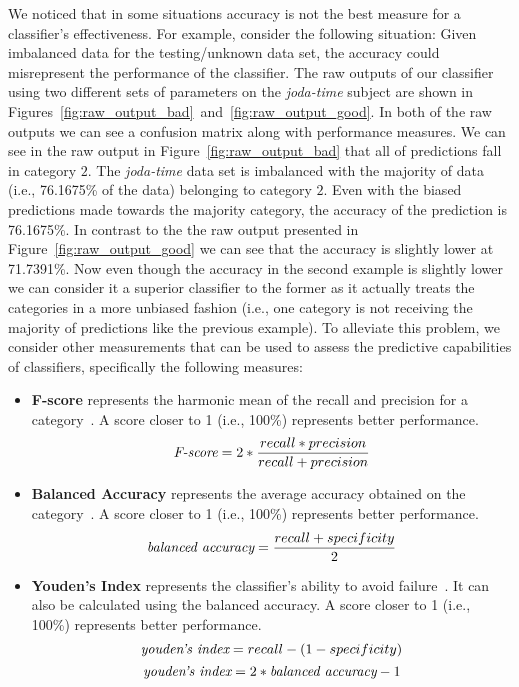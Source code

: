 We noticed that in some situations accuracy is not the best measure for a classifier's effectiveness. For example, consider the following situation: Given imbalanced data for the testing/unknown data set, the accuracy could misrepresent the performance of the classifier. The raw outputs of our classifier using two different sets of parameters on the \emph{joda-time} subject are shown in Figures~\ref{fig:raw_output_bad}~and~\ref{fig:raw_output_good}. In both of the raw outputs we can see a confusion matrix along with performance measures. We can see in the raw output in Figure~\ref{fig:raw_output_bad} that all of predictions fall in category $2$. The \emph{joda-time} data set is imbalanced with the majority of data (i.e., 76.1675\% of the data) belonging to category $2$. Even with the biased predictions made towards the majority category, the accuracy of the prediction is 76.1675\%. In contrast to the the raw output presented in Figure~\ref{fig:raw_output_good} we can see that the accuracy is slightly lower at 71.7391\%. Now even though the accuracy in the second example is slightly lower we can consider it a superior classifier to the former as it actually treats the categories in a more unbiased fashion (i.e., one category is not receiving the majority of predictions like the previous example). To alleviate this problem, we consider other measurements that can be used to assess the predictive capabilities of classifiers, specifically the following measures:

\begin{itemize}
  \item \textbf{F-score} represents the harmonic mean of the recall and precision for a category~\cite{SJS06}. A score closer to 1 (i.e., 100\%) represents better performance.
  \begin{equation}
    \emph{$\text{F-score} = 2*\frac{recall * precision}{recall + precision}$}
    \label{equ:f_score}
  \end{equation}

  \item \textbf{Balanced Accuracy} represents the average accuracy obtained on the category~\cite{BOSB10, SJS06}. A score closer to 1 (i.e., 100\%) represents better performance.
  \begin{equation}
    \emph{$\text{balanced accuracy} = \frac{recall + specificity}{2}$}
    \label{equ:balanced_area_under_curve}
  \end{equation}

  \item \textbf{Youden's Index} represents the classifier's ability to avoid failure~\cite{SJS06}. It can also be calculated using the balanced accuracy. A score closer to 1 (i.e., 100\%) represents better performance.
  \begin{equation}
    \emph{$\text{youden's index} = recall - ( 1 - specificity)$}
    \label{equ:youden_index_a}
  \end{equation}
  \begin{equation}
    \emph{$\text{youden's index} = 2 * \text{balanced accuracy} - 1$}
    \label{equ:youden_index_b}
  \end{equation}
\end{itemize}

